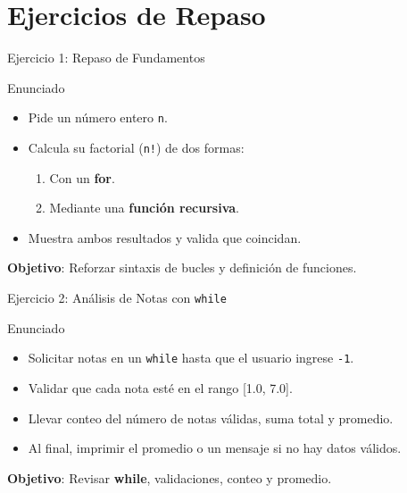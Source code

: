 \documentclass[10pt]{beamer}
\begin{document}
\section{Ejercicios de Repaso}

\begin{frame}{Ejercicio 1: Repaso de Fundamentos}
  \begin{block}{Enunciado}
    \begin{itemize}
      \item Pide un número entero \texttt{n}.
      \item Calcula su factorial (\texttt{n!}) de dos formas:
        \begin{enumerate}
          \item Con un \textbf{for}.
          \item Mediante una \textbf{función recursiva}.
        \end{enumerate}
      \item Muestra ambos resultados y valida que coincidan.
    \end{itemize}
  \end{block}
  \textbf{Objetivo}: Reforzar sintaxis de bucles y definición de funciones.
\end{frame}

\begin{frame}{Ejercicio 2: Análisis de Notas con \texttt{while}}
  \begin{block}{Enunciado}
    \begin{itemize}
      \item Solicitar notas en un \texttt{while} hasta que el usuario ingrese \texttt{-1}.
      \item Validar que cada nota esté en el rango [1.0, 7.0].
      \item Llevar conteo del número de notas válidas, suma total y promedio.
      \item Al final, imprimir el promedio o un mensaje si no hay datos válidos.
    \end{itemize}
  \end{block}
  \textbf{Objetivo}: Revisar \textbf{while}, validaciones, conteo y promedio.
\end{frame}
\end{document}

